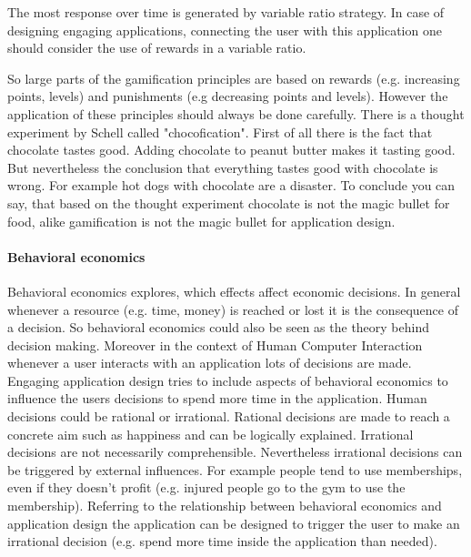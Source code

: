 The most response over time is generated by variable ratio strategy. In case of designing engaging applications, connecting the user with this application one should consider the use of rewards in a variable ratio. \cite[p. 11]{lewisIrresistibleAppsMotivational2014}

So large parts of the gamification principles are based on rewards (e.g. increasing points, levels) and punishments (e.g decreasing points and levels). However the application of these principles should always be done carefully. There is a thought experiment by Schell called "chocofication". First of all there is the fact that chocolate tastes good. Adding chocolate to peanut butter makes it tasting good. But nevertheless the conclusion that everything tastes good with chocolate is wrong. For example hot dogs with chocolate are a disaster. 
To conclude you can say, that based on the thought experiment chocolate is not the magic bullet for food, alike gamification is not the magic bullet for application design. \cite[p. 12]{lewisIrresistibleAppsMotivational2014}


\paragraph*{Behavioral economics}

Behavioral economics explores, which effects affect economic decisions. In general whenever a resource (e.g. time, money) is reached or lost it is the consequence of a decision. So behavioral economics could also be seen as the theory behind decision making. Moreover in the context of Human Computer Interaction whenever a user interacts with an application 
lots of decisions are made. Engaging application design tries to include aspects of behavioral economics to influence the users decisions to spend more time in the application. 
Human decisions could be rational or irrational. Rational decisions are made to reach a concrete aim such as happiness and can be logically explained. Irrational decisions are not necessarily comprehensible.  Nevertheless irrational decisions can be triggered by external influences. For example people tend to use memberships, even if they doesn't profit (e.g. injured people go to the gym to use the membership).
Referring to the relationship between behavioral economics and application design the application can be designed to trigger the user to make an irrational decision (e.g. spend more time inside the application than needed). \cite[p. 19]{lewisIrresistibleAppsMotivational2014}


